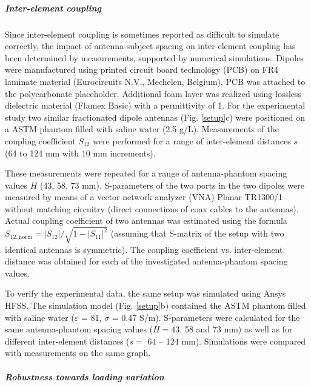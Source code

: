\documentclass[fleqn,10pt]{wlscirep}
\begin{document}
\subparagraph*{Inter-element coupling}

Since inter-element coupling is sometimes reported as difficult to simulate correctly, the impact of antenna-subject spacing on inter-element coupling has been determined by measurements, supported by numerical simulations. 
Dipoles were manufactured using printed circuit board technology (PCB) on FR4 laminate material (Eurocircuits N.V., Mechelen, Belgium). PCB was attached to the polycarbonate placeholder. Additional foam layer was realized using lossless dielectric material (Flamex Basic) with a permittivity of 1. For the experimental study two similar fractionated dipole antennas (Fig. \ref{setup}c) were positioned on a ASTM phantom filled with saline water (2.5 g/L). Measurements of the coupling coefficient $S_{12}$ were performed for a range of inter-element distances $s$ (64 to 124 mm with 10 mm increments). 

These measurements were repeated for a range of antenna-phantom spacing values $H$ (43, 58, 73 mm). S-parameters of the two ports in the two dipoles were measured by means of a vector network analyzer (VNA) Planar TR1300/1 without matching circuitry (direct connections of coax cables to the antennas). Actual coupling coefficient of two antennas was estimated using the formula $S_{12,\text{norm}} = |S_{12}|/{\sqrt{1-|S_{11}|^2}}$ (assuming that S-matrix of the setup with two identical antennas is symmetric). The coupling coefficient vs. inter-element distance was obtained for each of the investigated antenna-phantom spacing values.

To verify the experimental data, the same setup was simulated using Ansys HFSS. The simulation model (Fig. \ref{setup}b) contained the ASTM phantom filled with saline water ($\varepsilon$ = 81, $\sigma$  = 0.47 S/m). S-parameters were calculated for the same antenna-phantom spacing values ($H=43$, 58 and 73 mm) as well as for different inter-element distances ($s=$ 64 – 124 mm). Simulations were compared with measurements on the same graph. 

\subparagraph*{Robustness towards loading variation}
\end{document}
